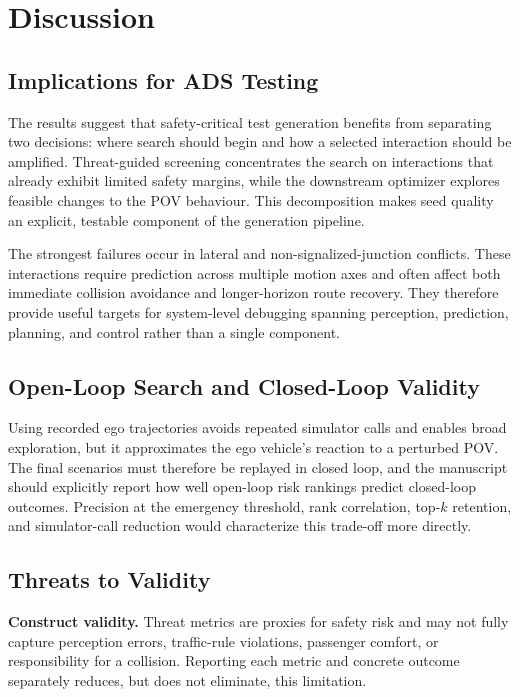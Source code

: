 \section{Discussion}

\subsection{Implications for ADS Testing}

The results suggest that safety-critical test generation benefits from separating two decisions: where search should begin and how a selected interaction should be amplified. Threat-guided screening concentrates the search on interactions that already exhibit limited safety margins, while the downstream optimizer explores feasible changes to the POV behaviour. This decomposition makes seed quality an explicit, testable component of the generation pipeline.

The strongest failures occur in lateral and non-signalized-junction conflicts. These interactions require prediction across multiple motion axes and often affect both immediate collision avoidance and longer-horizon route recovery. They therefore provide useful targets for system-level debugging spanning perception, prediction, planning, and control rather than a single component.

\subsection{Open-Loop Search and Closed-Loop Validity}

Using recorded ego trajectories avoids repeated simulator calls and enables broad exploration, but it approximates the ego vehicle's reaction to a perturbed POV. The final scenarios must therefore be replayed in closed loop, and the manuscript should explicitly report how well open-loop risk rankings predict closed-loop outcomes. Precision at the emergency threshold, rank correlation, top-$k$ retention, and simulator-call reduction would characterize this trade-off more directly.

\subsection{Threats to Validity}

\textbf{Construct validity.} Threat metrics are proxies for safety risk and may not fully capture perception errors, traffic-rule violations, passenger comfort, or responsibility for a collision. Reporting each metric and concrete outcome separately reduces, but does not eliminate, this limitation.


